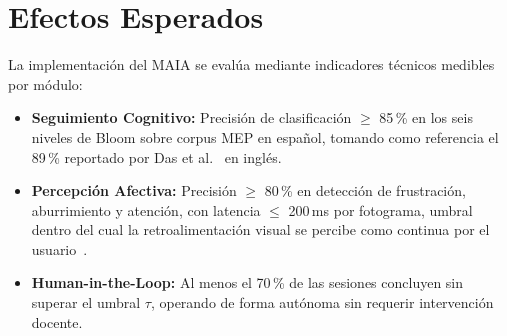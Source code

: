\section{Efectos Esperados}

La implementación del MAIA se evalúa mediante indicadores técnicos medibles
por módulo:

\begin{itemize}
    \item \textbf{Seguimiento Cognitivo:} Precisión de clasificación
    $\geq$ 85\,\% en los seis niveles de Bloom sobre corpus MEP en español,
    tomando como referencia el 89\,\% reportado por Das et al.~\cite{Das2020}
    en inglés.

    \item \textbf{Percepción Afectiva:} Precisión $\geq$ 80\,\% en detección
    de frustración, aburrimiento y atención, con latencia $\leq$ 200\,ms
    por fotograma, umbral dentro del cual la retroalimentación visual se
    percibe como continua por el usuario~\cite{AISTY2024}.

    \item \textbf{Human-in-the-Loop:} Al menos el 70\,\% de las sesiones
    concluyen sin superar el umbral $\tau$, operando de forma autónoma sin
    requerir intervención docente.
\end{itemize}
